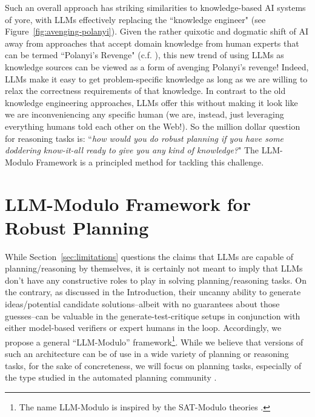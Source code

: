 \documentclass{article}
\newcommand{\rao}[1]{\noindent\textcolor{red}{#1}}
\theoremstyle{plain}
\theoremstyle{definition}
\theoremstyle{remark}
\begin{document}
Such an overall approach has striking similarities to knowledge-based AI systems of yore, with LLMs effectively replacing the ``knowledge engineer" (see Figure~\ref{fig:avenging-polanyi}). Given the rather quixotic and dogmatic shift of AI away from approaches that accept domain knowledge from human experts that can be termed ``Polanyi's Revenge" (c.f. \cite{polanyi-revenge}),
this new trend of using LLMs as knowledge sources can be viewed as a form of avenging Polanyi's revenge!  Indeed, LLMs make it easy to get problem-specific knowledge as long as we are willing to relax the correctness requirements of that knowledge. In contrast to the old knowledge engineering approaches, LLMs offer this without making it look like we are inconveniencing any specific human (we are, instead,  just leveraging everything humans told each other on the Web!).  So the million dollar question for reasoning tasks is: ``{\em how would you do robust planning if you have some doddering know-it-all ready to give you any kind of knowledge?}" The LLM-Modulo Framework is a principled method for tackling this challenge. 

\section{LLM-Modulo Framework for Robust Planning}
\label{sec:llm_modulo_framework}

While Section~\ref{sec:limitations} questions the claims that LLMs are capable of planning/reasoning by themselves, it is certainly not meant to imply that LLMs don't have any constructive roles to play in solving planning/reasoning tasks. On the contrary, as discussed in the Introduction, their uncanny ability to generate ideas/potential candidate solutions–albeit with no guarantees about those guesses–can be valuable in the generate-test-critique setups in conjunction with either model-based verifiers or 
expert humans in the loop. Accordingly, we propose a general ``LLM-Modulo'' framework\footnote{The name LLM-Modulo is inspired by the SAT-Modulo theories \cite{sat-modulo}.}. While we believe that versions of such an architecture can be of use in a wide variety of planning or reasoning tasks, for the sake of concreteness, we will focus on planning tasks, especially of the type studied in the automated planning community \cite{ghallab2004automated}.
\end{document}
